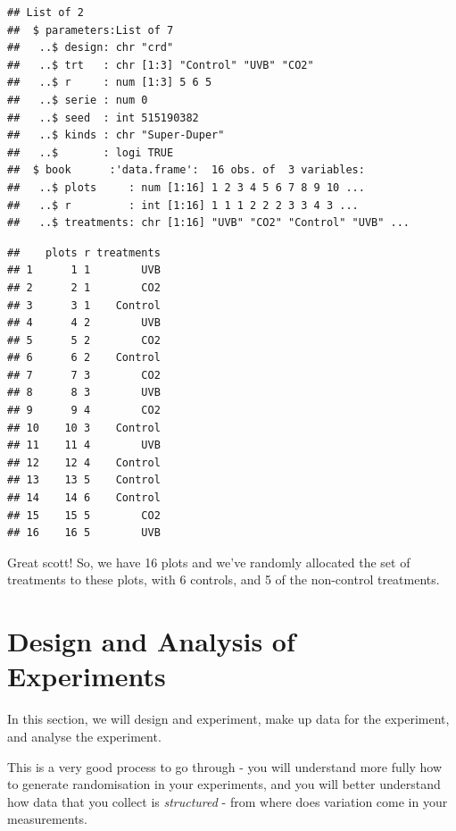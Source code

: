 \documentclass[
]{book}
\newenvironment{Shaded}{\begin{snugshade}}{\end{snugshade}}
\newcommand{\CommentTok}[1]{\textcolor[rgb]{0.56,0.35,0.01}{\textit{#1}}}
\newcommand{\NormalTok}[1]{#1}
\newcommand{\OtherTok}[1]{\textcolor[rgb]{0.56,0.35,0.01}{#1}}
\newcommand{\SpecialCharTok}[1]{\textcolor[rgb]{0.00,0.00,0.00}{#1}}
\begin{document}
\begin{verbatim}
## List of 2
##  $ parameters:List of 7
##   ..$ design: chr "crd"
##   ..$ trt   : chr [1:3] "Control" "UVB" "CO2"
##   ..$ r     : num [1:3] 5 6 5
##   ..$ serie : num 0
##   ..$ seed  : int 515190382
##   ..$ kinds : chr "Super-Duper"
##   ..$       : logi TRUE
##  $ book      :'data.frame':  16 obs. of  3 variables:
##   ..$ plots     : num [1:16] 1 2 3 4 5 6 7 8 9 10 ...
##   ..$ r         : int [1:16] 1 1 1 2 2 2 3 3 4 3 ...
##   ..$ treatments: chr [1:16] "UVB" "CO2" "Control" "UVB" ...
\end{verbatim}

\begin{Shaded}
\end{Shaded}

\begin{verbatim}
##    plots r treatments
## 1      1 1        UVB
## 2      2 1        CO2
## 3      3 1    Control
## 4      4 2        UVB
## 5      5 2        CO2
## 6      6 2    Control
## 7      7 3        CO2
## 8      8 3        UVB
## 9      9 4        CO2
## 10    10 3    Control
## 11    11 4        UVB
## 12    12 4    Control
## 13    13 5    Control
## 14    14 6    Control
## 15    15 5        CO2
## 16    16 5        UVB
\end{verbatim}

Great scott! So, we have 16 plots and we've randomly allocated the set of treatments to these plots, with 6 controls, and 5 of the non-control treatments.

\hypertarget{design-and-analysis-of-experiments}{%
\chapter{Design and Analysis of Experiments}\label{design-and-analysis-of-experiments}}

In this section, we will design and experiment, make up data for the experiment, and analyse the experiment.

This is a very good process to go through - you will understand more fully how to generate randomisation in your experiments, and you will better understand how data that you collect is \emph{structured} - from where does variation come in your measurements.
\end{document}

